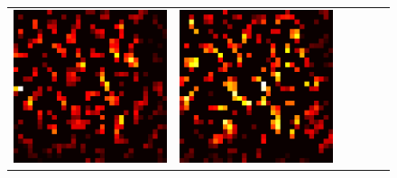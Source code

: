 \documentclass[preprint,12pt]{elsarticle}
\begin{document}
\begin{figure}[p]
\begin{tabular}{cccccc}
  \includegraphics[scale=\scale]{../visualizations/examples/cifar10/resnet18/active_saliency_map/3.png} & 
  \includegraphics[scale=\scale]{../visualizations/examples/cifar10/resnet18/inactive_saliency_map/3.png} \\
  

\end{tabular}
\end{figure}
\end{document}
